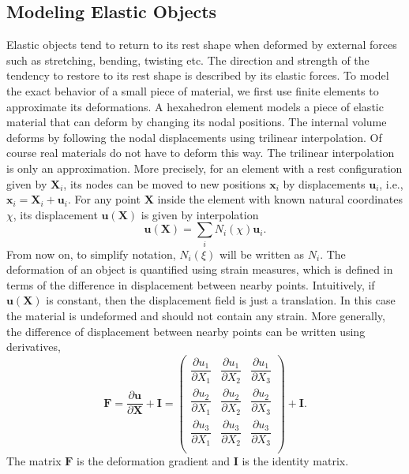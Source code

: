 \subsection{Modeling Elastic Objects}
Elastic objects tend to return to its rest shape when deformed by external forces such as stretching, bending, twisting etc. The direction and strength of the tendency to restore to its rest shape is described by its elastic forces.
To model the exact behavior of a small piece of material,
we first use finite elements to approximate its deformations.
A hexahedron element models a piece of elastic material that can deform by changing its nodal positions.
The internal volume deforms by following the nodal displacements using trilinear interpolation.
Of course real materials do not have to deform this way.
The trilinear interpolation is only an approximation.
More precisely, for an element with a rest configuration given by $\mathbf{X}_i$,
its nodes can be moved to new positions $\mathbf{x}_i$ by displacements $\mathbf{u}_i$,
i.e., $\mathbf{x}_i=\mathbf{X}_i+\mathbf{u}_i$.
For any point $\mathbf{X}$ inside the element with known natural coordinates $\chi$, its displacement $\mathbf{u}(\mathbf{X})$ is given by interpolation
\begin{equation}
\mathbf{u}(\mathbf{X}) = \sum_iN_i(\chi)\mathbf{u}_i.
\label{eq:disp}
\end{equation}
From now on, to simplify notation, $N_i(\xi)$ will be written as $N_i$.
The deformation of an object is quantified using strain measures,
which is defined in terms of the difference in displacement between nearby points.
Intuitively, if $\mathbf{u}(\mathbf{X})$ is constant, then the displacement field is just a translation. In this case the material is undeformed and should not contain any strain.
More generally, the difference of displacement between nearby points can be written using derivatives,
\[
\mathbf{F}=\frac{\partial \mathbf{u}}{\partial \mathbf{X}}+\mathbf{I}
=\begin{pmatrix}
\dfrac{\partial u_1}{\partial X_1} & \dfrac{\partial u_1}{\partial X_2}&\dfrac{\partial u_1}{\partial X_3}\\
\dfrac{\partial u_2}{\partial X_1} & \dfrac{\partial u_2}{\partial X_2}&\dfrac{\partial u_2}{\partial X_3}\\
\dfrac{\partial u_3}{\partial X_1} & \dfrac{\partial u_3}{\partial X_2}&\dfrac{\partial u_3}{\partial X_3}\\
\end{pmatrix}+\mathbf{I}.
\]
The matrix $\mathbf{F}$ is the deformation gradient and $\mathbf{I}$ is the identity matrix.
